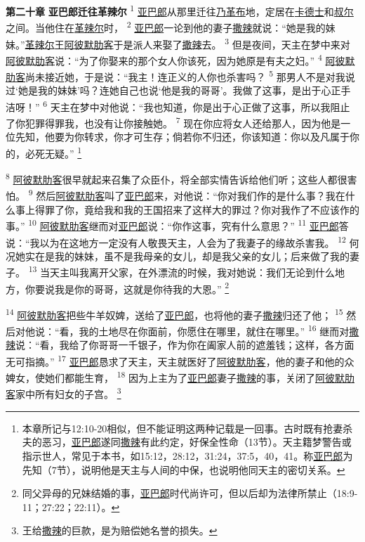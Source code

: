 \textbf{第二十章 }
\textbf{亚巴郎迁往革辣尔 }
\textsuperscript{1}
\uline{亚巴郎}从那里迁往\uline{乃革布}地，定居在\uline{卡德士}和\uline{叔尔}之间。当他住在\uline{革辣尔}时，
\textsuperscript{2}
\uline{亚巴郎}一论到他的妻子\uline{撒辣}就说：“她是我的妹妹。”\uline{革辣尔}王\uline{阿彼默}\uline{肋客}于是派人来娶了\uline{撒辣}去。
\textsuperscript{3}
但是夜间，天主在梦中来对\uline{阿彼默}\uline{肋客}说：“为了你娶来的那个女人你该死，因为她原是有夫之妇。”
\textsuperscript{4}
\uline{阿彼默}\uline{肋客}尚未接近她，于是说：“我主！连正义的人你也杀害吗？
\textsuperscript{5}
那男人不是对我说过‘她是我的妹妹’吗？连她自己也说‘他是我的哥哥’。我做了这事，是出于心正手洁呀！”
\textsuperscript{6}
天主在梦中对他说：“我也知道，你是出于心正做了这事，所以我阻止了你犯罪得罪我，也没有让你接触她。
\textsuperscript{7}
现在你应将女人还给那人，因为他是一位先知，他要为你转求，你才可生存；倘若你不归还，你该知道：你以及凡属于你的，必死无疑。”
\footnote{本章所记与12:10-20相似，但不能证明这两种记载是一回事。古时既有抢妻杀夫的恶习，\uline{亚巴郎}遂同\uline{撒辣}有此约定，好保全性命（13节）。天主籍梦警告或指示世人，常见于本书，如15:12，28:12，31:24，37:5，40，41。称\uline{亚巴郎}为先知（7节），说明他是天主与人间的中保，也说明他同天主的密切关系。}

\textsuperscript{8}
\uline{阿彼默}\uline{肋客}很早就起来召集了众臣仆，将全部实情告诉给他们听；这些人都很害怕。
\textsuperscript{9}
然后\uline{阿彼默}\uline{肋客}叫了\uline{亚巴郎}来，对他说：“你对我们作的是什么事？我在什么事上得罪了你，竟给我和我的王国招来了这样大的罪过？你对我作了不应该作的事。”
\textsuperscript{10}
\uline{阿彼默}\uline{肋客}继而对\uline{亚巴郎}说：“你作这事，究有什么意思？”
\textsuperscript{11}
\uline{亚巴郎}答说：“我以为在这地方一定没有人敬畏天主，人会为了我妻子的缘故杀害我。
\textsuperscript{12}
何况她实在是我的妹妹，虽不是我母亲的女儿，却是我父亲的女儿；后来做了我的妻子。
\textsuperscript{13}
当天主叫我离开父家，在外漂流的时候，我对她说：我们无论到什么地方，你要说我是你的哥哥，这就是你待我的大恩。”
\footnote{同父异母的兄妹结婚的事，\uline{亚巴郎}时代尚许可，但以后却为法律所禁止（18:9-11；27:22；22:11）。}

\textsuperscript{14}
\uline{阿彼默}\uline{肋客}把些牛羊奴婢，送给了\uline{亚巴郎}，也将他的妻子\uline{撒辣}归还了他；
\textsuperscript{15}
然后对他说：“看，我的土地尽在你面前，你愿住在哪里，就住在哪里。”
\textsuperscript{16}
继而对\uline{撒辣}说：“看，我给了你哥哥一千银子，作为你在阖家人前的遮羞钱；这样，各方面无可指摘。”
\textsuperscript{17}
\uline{亚巴郎}恳求了天主，天主就医好了\uline{阿彼默}\uline{肋客}，他的妻子和他的众婢女，使她们都能生育，
\textsuperscript{18}
因为上主为了\uline{亚巴郎}妻子\uline{撒辣}的事，关闭了\uline{阿彼默}\uline{肋客}家中所有妇女的子宫。
\footnote{王给\uline{撒辣}的巨款，是为赔偿她名誉的损失。}

